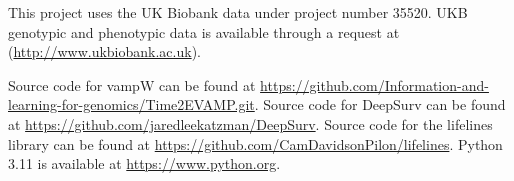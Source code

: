 This project uses the UK Biobank data under project number 35520. UKB genotypic and phenotypic data is available through a request at (\url{http://www.ukbiobank.ac.uk}). 

Source code for vampW can be found at \url{https://github.com/Information-and-learning-for-genomics/Time2EVAMP.git}. Source code for DeepSurv can be found at \url{https://github.com/jaredleekatzman/DeepSurv}. Source code for the lifelines library can be found at \url{https://github.com/CamDavidsonPilon/lifelines}.  Python 3.11 is available at \url{https://www.python.org}.